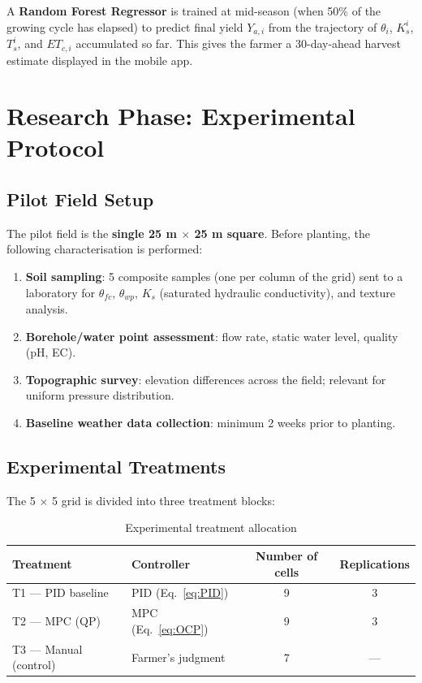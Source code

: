 \documentclass[12pt, a4paper]{report}
\begin{document}
A \textbf{Random Forest Regressor} is trained at mid-season (when 50\% of the growing cycle has elapsed) to predict final yield $Y_{a,i}$ from the trajectory of $\theta_i$, $K_s^i$, $T_s^i$, and $ET_{c,i}$ accumulated so far. This gives the farmer a 30-day-ahead harvest estimate displayed in the mobile app.

\chapter{Research Phase: Experimental Protocol}

\section{Pilot Field Setup}

The pilot field is the \textbf{single 25 m $\times$ 25 m square}. Before planting, the following characterisation is performed:
\begin{enumerate}[leftmargin=2em]
  \item \textbf{Soil sampling}: 5 composite samples (one per column of the grid) sent to a laboratory for $\theta_{fc}$, $\theta_{wp}$, $K_s$ (saturated hydraulic conductivity), and texture analysis.
  \item \textbf{Borehole/water point assessment}: flow rate, static water level, quality (pH, EC).
  \item \textbf{Topographic survey}: elevation differences across the field; relevant for uniform pressure distribution.
  \item \textbf{Baseline weather data collection}: minimum 2 weeks prior to planting.
\end{enumerate}

\section{Experimental Treatments}

The 5 $\times$ 5 grid is divided into three treatment blocks:

\begin{table}[H]
\centering
\caption{Experimental treatment allocation}
\label{tab:treatments}
\renewcommand{\arraystretch}{1.3}
\begin{tabular}{llcc}
\toprule
\textbf{Treatment} & \textbf{Controller} & \textbf{Number of cells} & \textbf{Replications}\\
\midrule
T1 — PID baseline      & PID (Eq.~\ref{eq:PID})  & 9 & 3 \\
T2 — MPC (QP)          & MPC (Eq.~\ref{eq:OCP}) & 9 & 3 \\
T3 — Manual (control)  & Farmer's judgment       & 7 & — \\
\bottomrule
\end{tabular}
\end{table}
\end{document}
